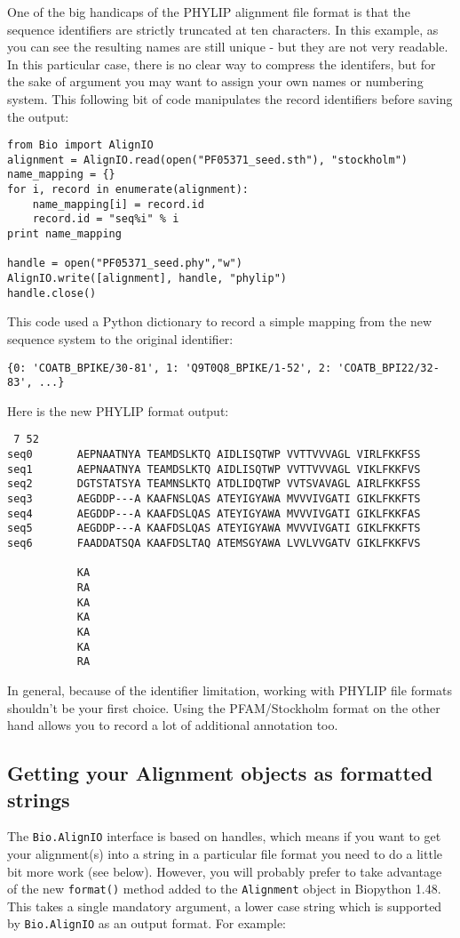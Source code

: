 \documentclass{report}
\begin{document}
One of the big handicaps of the PHYLIP alignment file format is that the sequence identifiers are strictly truncated at ten characters.  In this example, as you can see the resulting names are still unique - but they are not very readable.  In this particular case, there is no clear way to compress the identifers, but for the sake of argument you may want to assign your own names or numbering system.  This following bit of code manipulates the record identifiers before saving the output:

\begin{verbatim}
from Bio import AlignIO
alignment = AlignIO.read(open("PF05371_seed.sth"), "stockholm")
name_mapping = {}
for i, record in enumerate(alignment):
    name_mapping[i] = record.id
    record.id = "seq%i" % i
print name_mapping

handle = open("PF05371_seed.phy","w")
AlignIO.write([alignment], handle, "phylip")
handle.close()
\end{verbatim}

\noindent This code used a Python dictionary to record a simple mapping from the new sequence system to the original identifier:
\begin{verbatim}
{0: 'COATB_BPIKE/30-81', 1: 'Q9T0Q8_BPIKE/1-52', 2: 'COATB_BPI22/32-83', ...}
\end{verbatim}

\noindent Here is the new PHYLIP format output:
\begin{verbatim}
 7 52
seq0       AEPNAATNYA TEAMDSLKTQ AIDLISQTWP VVTTVVVAGL VIRLFKKFSS
seq1       AEPNAATNYA TEAMDSLKTQ AIDLISQTWP VVTTVVVAGL VIKLFKKFVS
seq2       DGTSTATSYA TEAMNSLKTQ ATDLIDQTWP VVTSVAVAGL AIRLFKKFSS
seq3       AEGDDP---A KAAFNSLQAS ATEYIGYAWA MVVVIVGATI GIKLFKKFTS
seq4       AEGDDP---A KAAFDSLQAS ATEYIGYAWA MVVVIVGATI GIKLFKKFAS
seq5       AEGDDP---A KAAFDSLQAS ATEYIGYAWA MVVVIVGATI GIKLFKKFTS
seq6       FAADDATSQA KAAFDSLTAQ ATEMSGYAWA LVVLVVGATV GIKLFKKFVS

           KA
           RA
           KA
           KA
           KA
           KA
           RA
\end{verbatim}

\noindent In general, because of the identifier limitation, working with PHYLIP file formats shouldn't be your first choice.  Using the PFAM/Stockholm format on the other hand allows you to record a lot of additional annotation too.

\subsection{Getting your Alignment objects as formatted strings}
\label{sec:alignment-format-method}
The \verb|Bio.AlignIO| interface is based on handles, which means if you want to get your alignment(s) into a string in a particular file format you need to do a little bit more work (see below).  
However, you will probably prefer to take advantage of the new \verb|format()| method added to the \verb|Alignment| object in Biopython 1.48.  This takes a single mandatory argument, a lower case string which is supported by \verb|Bio.AlignIO| as an output format.  For example:
\end{document}
